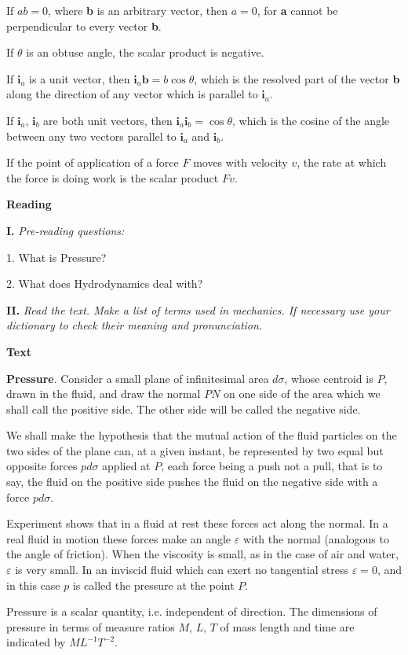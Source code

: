 \documentclass[a4paper]{article}
\newcounter{EUnits}
\newcommand{\EUnit}{\par\medskip{\huge \textbf{Unit \arabic{EUnits}}}\par\stepcounter{EUnits}}
\newcommand{\ESect}[1]{\medskip\par{\large \textbf{#1}}\par}
\newcommand{\ETask}[2]{\medskip\par\textbf{#1.} \textit{#2}\par}
\begin{document}
If $ab = 0$, where \textbf{b} is an arbitrary vector, then $a = 0$, for \textbf{a} cannot be perpendicular to every vector
\textbf{b}.

If $\theta$ is an obtuse angle, the scalar product is negative.

If $\textbf{i}_a$ is a unit vector, then $\textbf{i}_a\textbf{b} = b \cos \theta$, which is the resolved part of the vector \textbf{b}
along the direction of any vector which is parallel to $\textbf{i}_a$.

If $\textbf{i}_a$, $\textbf{i}_b$ are both unit vectors, then $\textbf{i}_a\textbf{i}_b = \cos \theta$, which is the cosine of
the angle between any two vectors parallel to $\textbf{i}_a$ and $\textbf{i}_b$.

If the point of application of a force $F$ moves with velocity $v$, the rate at which the force is doing work is the scalar
product $Fv$.

\EUnit
\setcounter{equation}{0}
\ESect{Reading}
\ETask{I}{Pre-reading questions:}
1. What is Pressure?

2. What does Hydrodynamics deal with?

\ETask{II}{Read the text. Make a list of terms used in mechanics. If necessary use your dictionary to check their meaning and
pronunciation.}

\ESect{Text}
\textbf{Pressure}. Consider a small plane of infinitesimal area $d\sigma$, whose centroid is $P$, drawn in the fluid, and draw
the normal $PN$ on one side of the area which we shall call the positive side. The other side will be called the negative side.

We shall make the hypothesis that the mutual action of the fluid particles on the two sides of the plane can, at a given
instant, be represented by two equal but opposite forces $p d \sigma$ applied at $P$, each force being a push not a pull, that
is to say, the fluid on the positive side pushes the fluid on the negative side with a force $p d \sigma$.

Experiment shows that in a fluid at rest these forces act along the normal. In a real fluid in motion these forces make an
angle $\varepsilon$ with the normal (analogous to the angle of friction). When the viscosity is small, as in the case of air
and water, $\varepsilon$ is very small. In an inviscid fluid which can exert no tangential stress $\varepsilon = 0$, and in
this case $p$ is called the pressure at the point $P$.

Pressure is a scalar quantity, i.e. independent of direction. The dimensions of pressure in terms of measure ratios $M$, $L$, $T$
of mass length and time are indicated by $ML^{-1}T^{-2}$.
\end{document}
